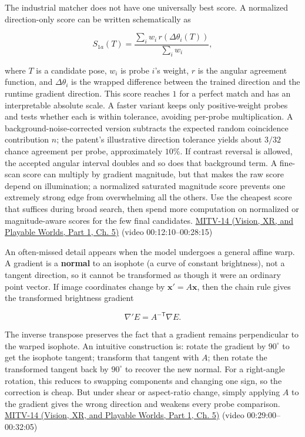 \hypertarget{04-visual-computing-ii-ch030-the-score-is-a-design-choice-and-affine-transforms-act-on-normals}{}

The industrial matcher does not have one universally best score. A normalized direction-only score can be written schematically as

\[
S_{1a}(T)=\frac{\sum_i w_i\,r(\Delta\theta_i(T))}{\sum_i w_i},
\]

where \(T\) is a candidate pose, \(w_i\) is probe \(i\)'s weight, \(r\) is the angular agreement function, and \(\Delta\theta_i\) is the wrapped difference between the trained direction and the runtime gradient direction. This score reaches \(1\) for a perfect match and has an interpretable absolute scale. A faster variant keeps only positive-weight probes and tests whether each is within tolerance, avoiding per-probe multiplication. A background-noise-corrected version subtracts the expected random coincidence contribution \(n\); the patent's illustrative direction tolerance yields about \(3/32\) chance agreement per probe, approximately \(10\%\). If contrast reversal is allowed, the accepted angular interval doubles and so does that background term. A fine-scan score can multiply by gradient magnitude, but that makes the raw score depend on illumination; a normalized saturated magnitude score prevents one extremely strong edge from overwhelming all the others. Use the cheapest score that suffices during broad search, then spend more computation on normalized or magnitude-aware scores for the few final candidates. \href{../07-Vision-XR-and-Playable-Worlds-P01/main.pdf\#nameddest=04-visual-computing-ii-ch036-mitv-14---inspection-in-patquick-hough-transform-homography-position-determination-multi-scale}{MITV-14 (Vision, XR, and Playable Worlds, Part 1, Ch. 5)} (video 00:12:10--00:28:15)

An often-missed detail appears when the model undergoes a general affine warp. A gradient is a \textbf{normal} to an isophote (a curve of constant brightness), not a tangent direction, so it cannot be transformed as though it were an ordinary point vector. If image coordinates change by \(\mathbf{x}'=A\mathbf{x}\), then the chain rule gives the transformed brightness gradient

\[
\nabla' E=A^{-\mathsf T}\nabla E.
\]

The inverse transpose preserves the fact that a gradient remains perpendicular to the warped isophote. An intuitive construction is: rotate the gradient by \(90^\circ\) to get the isophote tangent; transform that tangent with \(A\); then rotate the transformed tangent back by \(90^\circ\) to recover the new normal. For a right-angle rotation, this reduces to swapping components and changing one sign, so the correction is cheap. But under shear or aspect-ratio change, simply applying \(A\) to the gradient gives the wrong direction and weakens every probe comparison. \href{../07-Vision-XR-and-Playable-Worlds-P01/main.pdf\#nameddest=04-visual-computing-ii-ch036-mitv-14---inspection-in-patquick-hough-transform-homography-position-determination-multi-scale}{MITV-14 (Vision, XR, and Playable Worlds, Part 1, Ch. 5)} (video 00:29:00--00:32:05)

